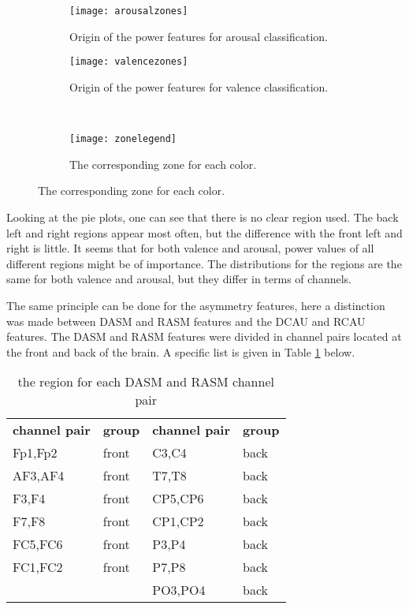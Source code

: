 \begin{figure}[H]
\centering
  \begin{subfigure}[b]{.4\textwidth}
    \texttt{[image: arousalzones]}
    \caption{Origin of the power features for arousal classification.\label{arousalzones}}
  \end{subfigure}
\hfill
  \begin{subfigure}[b]{.4\textwidth}
    \texttt{[image: valencezones]}
    \caption{Origin of the power features for valence classification.\label{valencezones}}
  \end{subfigure}
\\
  \begin{subfigure}[b]{.7\textwidth}
    \texttt{[image: zonelegend]}
    \caption{The corresponding zone for each color.\label{zonelegend}}
  \end{subfigure}
\end{figure}

Looking at the pie plots, one can see that there is no clear region used. The back left and right regions appear most often, but the difference with the front left and right is little. It seems that for both valence and arousal, power values of all different regions might be of importance. The distributions for the regions are the same for both valence and arousal, but they differ in terms of channels.

\npar

The same principle can be done for the asymmetry features, here a distinction was made between DASM and RASM features and the DCAU and RCAU features. The DASM and RASM features were divided in channel pairs located at the front and back of the brain. A specific list is given in Table \ref{ASMgroupTable} below.

\begin{table}[H]
\centering
\begin{tabular}{ll|ll}
\textbf{channel pair} & \textbf{group} & \textbf{channel pair} & \textbf{group} \\
Fp1,Fp2               & front          & C3,C4                 & back           \\
AF3,AF4               & front          & T7,T8                 & back           \\
F3,F4                 & front          & CP5,CP6               & back           \\
F7,F8                 & front          & CP1,CP2               & back           \\
FC5,FC6               & front          & P3,P4                 & back           \\
FC1,FC2               & front          & P7,P8                 & back           \\
                      &                & PO3,PO4               & back          
\end{tabular}
\caption{the region for each DASM and RASM channel pair\label{ASMgroupTable}}
\end{table}

